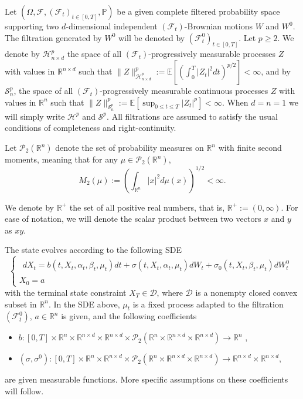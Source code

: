 \documentclass[11pt,a4paper]{article}
\begin{document}
Let $(\Omega, \mathcal{F},(\mathcal{F}_t)_{t\in [0,T]}, \mathbb{P})$  be a given complete filtered probability space supporting two $d$-dimensional independent $(\mathcal F_t)$-Brownian motions $W$ and $W^0$.  The filtration generated by $W^0$ will be denoted  by $(\mathcal{F}^0_t)_{t\in [0,T]}$. Let $p\geq 2$. We denote by $\mathcal H^p _{n\times d}$ the space of all $(\mathcal{F}_t)$-progressively measurable processes $Z$ with values in $\mathbb{R}^{n\times d}$ such that $\|Z\|_{\mathcal H^p _{n\times d}}^p:= \mathbb E [(\int_0^T |Z_t|^2 dt )^{p/2}]< \infty$, and by $\mathcal S^p _n$, the space of all $(\mathcal{F}_t)$-progressively measurable continuous processes  $Z$ with values in $\mathbb{R}^n$ such that $\|Z\|^p _{\mathcal S^p _n} :=\mathbb E [\sup_{0 \leq t \leq T}|Z_t|^p]< \infty$. When $d=n=1$ we will simply write $\mathcal H^p$ and $\mathcal S^p$. All filtrations are assumed to satisfy the usual conditions of completeness and right-continuity.

Let $\mathcal{P}_2(\mathbb{R}^n)$ denote the set of probability measures on $\mathbb{R}^n$ with finite second moments, meaning that for any \( \mu \in \mathcal{P}_2(\mathbb{R}^n) \),
\[
    M_2 (\mu) := \left(\int_{\mathbb{R}^n} |x|^2 d\mu(x)\right)^{1/2} < \infty.
\]

We denote by $\mathbb R^+$ the set of all positive real numbers, that is, $\mathbb R^+:=(0, \infty).$ For ease of notation, we will denote the scalar product between two vectors $x$ and $y$ as $xy$.

The state evolves according to the following SDE
\begin{equation}
    \label{SDE CN}
\begin{cases}
    \begin{aligned}
       dX_t=b(t,X_t,  \alpha_t, \beta_t, \mu_t)dt+\sigma(t,X_t, \alpha_t, \mu_t)dW_t 
+\sigma_0(t,X_t, \beta_t, \mu_t)dW_t^0 
    \end{aligned}\\
X_0=a
\end{cases}
\end{equation}
with the terminal state constraint $X_T \in \mathcal{D}$, where $\mathcal{D}$ is a nonempty closed convex subset in $\mathbb{R}^n$. In the SDE above, $\mu_t$ is a fixed process adapted  to the filtration $(\mathcal F_t ^0)$, $a \in \mathbb{R}^n$ is given, and the following coefficients 
\begin{itemize}
    \item $b:[0, T ] \times\mathbb{R}^n\times  \mathbb{R}^{n\times d}\times \mathbb{R}^{n\times d} \times  \mathcal P_2(\mathbb R^n \times \mathbb R^{n\times d} \times \mathbb R^{n\times d}) \to \mathbb{R}^n$ ,
    \item $(\sigma, \sigma^0):[0, T ] \times\mathbb{R}^n\times  \mathbb{R}^{n\times d} \times  \mathcal P_2(\mathbb R^n \times \mathbb R^{n\times d} \times \mathbb R^{n\times d}) \to \mathbb{R}^{n\times d} \times \mathbb{R}^{n\times d}$,
\end{itemize}
are given measurable functions. More specific assumptions on these coefficients will follow.
\end{document}
